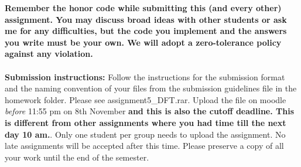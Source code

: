\documentclass[11pt]{article}
\begin{document}
\maketitle

\textbf{Remember the honor code while submitting this (and every other) assignment. You may discuss broad ideas with other students or ask me for any difficulties, but the code you implement and the answers you write must be your own. We will adopt a \textbf{zero-tolerance policy} against any violation.}
\\
\\
\textbf{Submission instructions:} Follow the instructions for the submission format and the naming convention of your files from the submission guidelines file in the homework folder. Please see \textsf{assignment5\_DFT.rar}. Upload the file on moodle \emph{before} 11:55 pm on 8th November \textbf{and this is also the cutoff deadline. This is different from other assignments where you had time till the next day 10 am.}.  Only one student per group needs to upload the assignment. No late assignments will be accepted after this time. Please preserve a copy of all your work until the end of the semester.  
\end{document}
